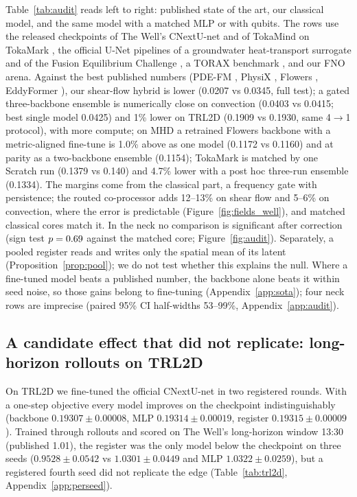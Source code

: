 \documentclass{article}
\newcommand{\TRLvanilla}{$0.19307 \pm 0.00008$}
\newcommand{\TRLquantum}{$0.19315 \pm 0.00009$}
\newcommand{\TRLmlp}{$0.19314 \pm 0.00019$}
\newcommand{\TDvanilla}{$1.0301 \pm 0.0449$}
\newcommand{\TDquantum}{$\mathbf{0.9528 \pm 0.0542}$}
\newcommand{\TDmlp}{$1.0322 \pm 0.0259$}
\begin{document}
Table~\ref{tab:audit} reads left to right: published state of the art, our classical model, and the same model with a
matched MLP or with qubits. The rows use the released checkpoints of The Well's CNextU-net \citep{ohana2024thewell} and
of TokaMind \citep{boschi2026tokamind} on TokaMark \citep{rousseau2026tokamark}, the official U-Net pipelines of a
groundwater heat-transport surrogate \citep{pelzer2025heat} and of the Fusion Equilibrium Challenge
\citep{waller2026fusion}, a TORAX benchmark \citep{citrin2024torax}, and our FNO arena. Against the best published numbers (PDE-FM \citep{soares2025pdefm}, PhysiX \citep{nguyen2025physix}, Flowers \citep{muser2026flowers}, EddyFormer \citep{du2025eddyformer}), our shear-flow hybrid is lower (0.0207 vs 0.0345, full test); a gated three-backbone ensemble is numerically close on convection (0.0403 vs 0.0415; best single model 0.0425) and 1\% lower on TRL2D (0.1909 vs 0.1930, same 4$\to$1 protocol), with more compute; on MHD a retrained Flowers backbone with a metric-aligned fine-tune is 1.0\% above as one model (0.1172 vs 0.1160) and at parity as a two-backbone ensemble (0.1154); TokaMark is matched by one Scratch run (0.1379 vs 0.140) and 4.7\% lower with a post hoc three-run ensemble (0.1334). The margins come from the classical part, a frequency gate with persistence; the routed co-processor adds 12--13\% on shear flow and 5--6\% on convection, where the error is predictable (Figure~\ref{fig:fields_well}), and matched classical cores match it. In
the neck no comparison is significant after correction (sign test $p=0.69$ against the matched core;
Figure~\ref{fig:audit}). Separately, a pooled register reads and writes only the spatial mean of its latent (Proposition~\ref{prop:pool}); we do not test whether this explains the null.
Where a fine-tuned model beats a published number, the backbone alone beats it within seed noise, so those gains
belong to fine-tuning (Appendix~\ref{app:sota}); four neck rows are imprecise (paired 95\% CI half-widths 53--99\%,
Appendix~\ref{app:audit}).

\subsection{A candidate effect that did not replicate: long-horizon rollouts on TRL2D}
\label{sec:trl2d}

On TRL2D we fine-tuned the official CNextU-net in two registered rounds. With a one-step objective every model
improves on the checkpoint indistinguishably (backbone \TRLvanilla, MLP \TRLmlp, register \TRLquantum). Trained through
rollouts \citep{brandstetter2022message} and scored on The Well's long-horizon window 13:30 (published 1.01), the
register was the only model below the checkpoint on three seeds (\TDquantum{} vs \TDvanilla{} and MLP \TDmlp), but a
registered fourth seed did not replicate the edge (Table~\ref{tab:trl2d}, Appendix~\ref{app:perseed}).
\end{document}
